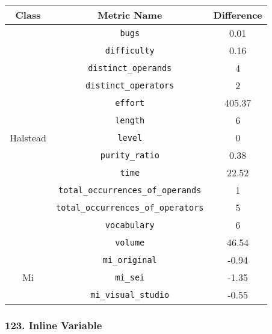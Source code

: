 \begin{center}
  \begin{tabular}{ |c|c|c| }
    \hline

    Class & Metric Name                           & Difference \\

    \hline

    \multirow{ 13 }{6em}{ Halstead }
          & \verb|bugs|                           & 0.01       \\
          & \verb|difficulty|                     & 0.16       \\
          & \verb|distinct_operands|              & 4          \\
          & \verb|distinct_operators|             & 2          \\
          & \verb|effort|                         & 405.37     \\
          & \verb|length|                         & 6          \\
          & \verb|level|                          & 0          \\
          & \verb|purity_ratio|                   & 0.38       \\
          & \verb|time|                           & 22.52      \\
          & \verb|total_occurrences_of_operands|  & 1          \\
          & \verb|total_occurrences_of_operators| & 5          \\
          & \verb|vocabulary|                     & 6          \\
          & \verb|volume|                         & 46.54      \\
    \hline
    \multirow{ 3 }{6em}{ Mi }
          & \verb|mi_original|                    & -0.94      \\
          & \verb|mi_sei|                         & -1.35      \\
          & \verb|mi_visual_studio|               & -0.55      \\
    \hline
  \end{tabular}
\end{center}
\subsubsection{ 123. Inline Variable }

